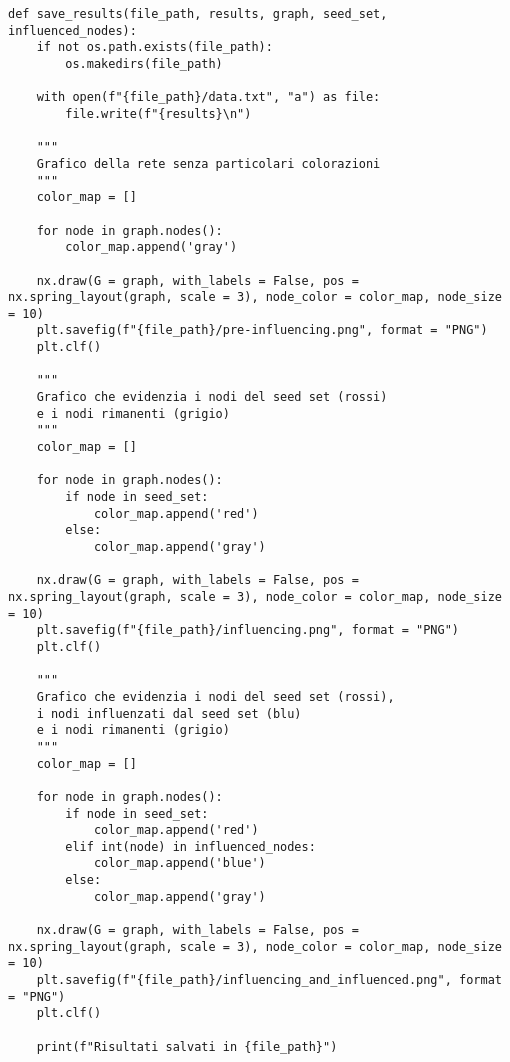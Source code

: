\begin{code}
\begin{verbatim}
def save_results(file_path, results, graph, seed_set, influenced_nodes):
    if not os.path.exists(file_path):
        os.makedirs(file_path)

    with open(f"{file_path}/data.txt", "a") as file:
        file.write(f"{results}\n")

    """
    Grafico della rete senza particolari colorazioni
    """
    color_map = []

    for node in graph.nodes():
        color_map.append('gray')

    nx.draw(G = graph, with_labels = False, pos = nx.spring_layout(graph, scale = 3), node_color = color_map, node_size = 10)
    plt.savefig(f"{file_path}/pre-influencing.png", format = "PNG")
    plt.clf()

    """
    Grafico che evidenzia i nodi del seed set (rossi) 
    e i nodi rimanenti (grigio)
    """
    color_map = []

    for node in graph.nodes():
        if node in seed_set:
            color_map.append('red')
        else:
            color_map.append('gray')

    nx.draw(G = graph, with_labels = False, pos = nx.spring_layout(graph, scale = 3), node_color = color_map, node_size = 10)
    plt.savefig(f"{file_path}/influencing.png", format = "PNG")
    plt.clf()

    """
    Grafico che evidenzia i nodi del seed set (rossi), 
    i nodi influenzati dal seed set (blu) 
    e i nodi rimanenti (grigio)
    """
    color_map = []

    for node in graph.nodes():
        if node in seed_set:
            color_map.append('red')
        elif int(node) in influenced_nodes: 
            color_map.append('blue')
        else:
            color_map.append('gray')

    nx.draw(G = graph, with_labels = False, pos = nx.spring_layout(graph, scale = 3), node_color = color_map, node_size = 10)
    plt.savefig(f"{file_path}/influencing_and_influenced.png", format = "PNG")
    plt.clf()

    print(f"Risultati salvati in {file_path}")
\end{verbatim}
\end{code}